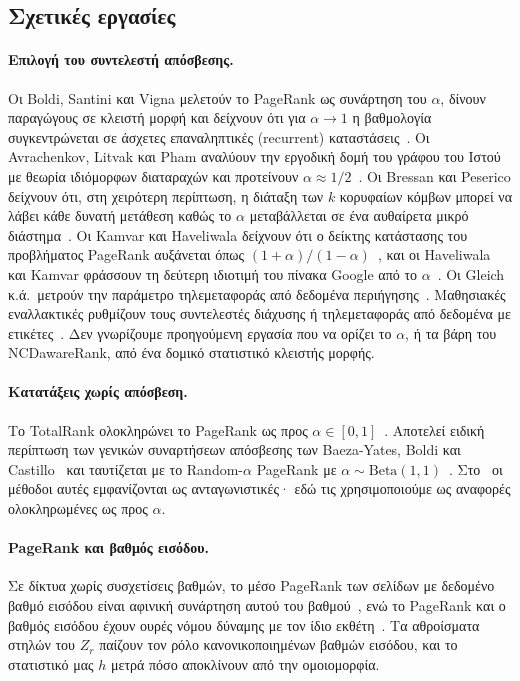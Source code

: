 \documentclass[11pt,a4paper]{article}
\theoremstyle{definition}
\theoremstyle{remark}
\begin{document}
\subsection{Σχετικές εργασίες}
\paragraph{Επιλογή του συντελεστή απόσβεσης.} Οι Boldi, Santini και Vigna μελετούν το PageRank ως
συνάρτηση του $\alpha$, δίνουν παραγώγους σε κλειστή μορφή και δείχνουν ότι για $\alpha\to1$ η
βαθμολογία συγκεντρώνεται σε άσχετες επαναληπτικές (recurrent) καταστάσεις~\cite{boldi05,boldi09}. Οι
Avrachenkov, Litvak και Pham αναλύουν την εργοδική δομή του γράφου του Ιστού με θεωρία ιδιόμορφων
διαταραχών και προτείνουν $\alpha\approx1/2$~\cite{avrachenkov08}. Οι Bressan και Peserico δείχνουν
ότι, στη χειρότερη περίπτωση, η διάταξη των $k$ κορυφαίων κόμβων μπορεί να λάβει κάθε δυνατή μετάθεση
καθώς το $\alpha$ μεταβάλλεται σε ένα αυθαίρετα μικρό διάστημα~\cite{bressan10}. Οι Kamvar και
Haveliwala δείχνουν ότι ο δείκτης κατάστασης του προβλήματος PageRank αυξάνεται όπως
$(1+\alpha)/(1-\alpha)$~\cite{kamvar03}, και οι Haveliwala και Kamvar φράσσουν τη δεύτερη ιδιοτιμή του
πίνακα Google από το $\alpha$~\cite{haveliwala03}. Οι Gleich κ.ά.\ μετρούν την παράμετρο
τηλεμεταφοράς από δεδομένα περιήγησης~\cite{gleich10}. Μαθησιακές εναλλακτικές ρυθμίζουν τους
συντελεστές διάχυσης ή τηλεμεταφοράς από δεδομένα με ετικέτες~\cite{berberidis19}. Δεν γνωρίζουμε
προηγούμενη εργασία που να ορίζει το $\alpha$, ή τα βάρη του NCDawareRank, από ένα δομικό στατιστικό
κλειστής μορφής.
\paragraph{Κατατάξεις χωρίς απόσβεση.} Το TotalRank ολοκληρώνει το PageRank ως προς
$\alpha\in[0,1]$~\cite{boldi05tr}. Αποτελεί ειδική περίπτωση των γενικών συναρτήσεων απόσβεσης των
Baeza-Yates, Boldi και Castillo~\cite{baeza06} και ταυτίζεται με το Random-$\alpha$ PageRank με
$\alpha\sim\mathrm{Beta}(1,1)$~\cite{constantine09}. Στο~\cite{ng13} οι μέθοδοι αυτές εμφανίζονται ως
ανταγωνιστικές· εδώ τις χρησιμοποιούμε ως αναφορές ολοκληρωμένες ως προς $\alpha$.
\paragraph{PageRank και βαθμός εισόδου.} Σε δίκτυα χωρίς συσχετίσεις βαθμών, το μέσο PageRank των
σελίδων με δεδομένο βαθμό εισόδου είναι αφινική συνάρτηση αυτού του βαθμού~\cite{fortunato08}, ενώ το
PageRank και ο βαθμός εισόδου έχουν ουρές νόμου δύναμης με τον ίδιο εκθέτη~\cite{litvak07}. Τα
αθροίσματα στηλών του $Z_r$ παίζουν τον ρόλο κανονικοποιημένων βαθμών εισόδου, και το στατιστικό μας
$h$ μετρά πόσο αποκλίνουν από την ομοιομορφία.
\end{document}
